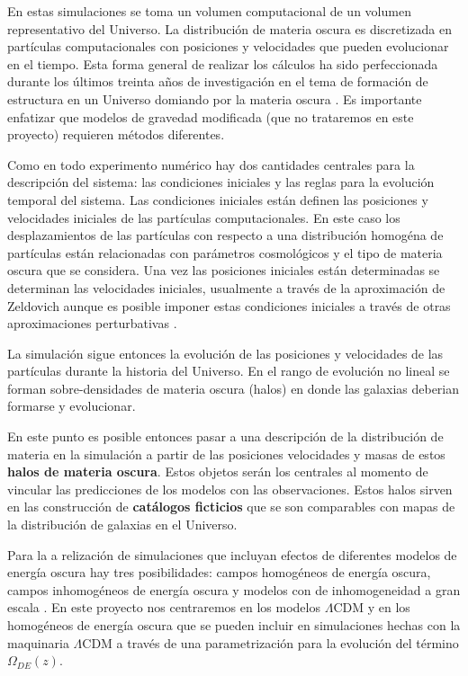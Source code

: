 En estas simulaciones se toma un volumen computacional de un volumen
representativo del Universo.
La distribuci\'on de materia oscura es discretizada en part\'iculas
computacionales con posiciones y velocidades que pueden evolucionar en
el tiempo.  
Esta forma general de realizar los c\'alculos ha sido
perfeccionada durante los \'ultimos treinta a\~nos de investigaci\'on
en el tema de formaci\'on de estructura en un Universo domiando por la
materia oscura
\cite{1985ApJ...292..371D,1999ApJ...522...82K,2005Natur.435..629S}. Es
importante enfatizar que modelos de gravedad modificada (que no
trataremos en este proyecto) requieren métodos diferentes.

Como en todo experimento num\'erico hay dos cantidades centrales para
la descripci\'on del sistema: las condiciones iniciales y las reglas
para la evoluci\'on temporal del sistema.  
Las condiciones iniciales est\'an definen las posiciones y velocidades
iniciales de las part\'iculas computacionales. 
En este caso los desplazamientos de las part\'iculas
con respecto a una distribuci\'on homog\'ena de part\'iculas están
relacionadas con parámetros cosmológicos y el tipo de materia oscura
que se considera.
Una vez las posiciones iniciales est\'an determinadas se
determinan las velocidades iniciales, usualmente a trav\'es de la
aproximaci\'on de Zeldovich aunque es posible imponer estas
condiciones iniciales a trav\'es de otras aproximaciones perturbativas
\cite{2014MNRAS.439.3630W}. 

La simulaci\'on sigue entonces la evoluci\'on de las posiciones y
velocidades de las part\'iculas durante la historia del
Universo. En el rango de evoluci\'on no lineal se forman
sobre-densidades de materia oscura (halos) en
donde  las galaxias deberian formarse y evolucionar. 

En este punto es posible entonces pasar a una
descripci\'on de la distribuci\'on de materia en la simulaci\'on a
partir de las posiciones  velocidades y masas de estos {\bf halos de materia
  oscura}. Estos objetos serán los centrales al momento de vincular
las predicciones de los modelos con las observaciones. Estos halos
sirven en las construcci\'on de {\bf cat\'alogos ficticios} que se
son comparables con mapas de la distribuci\'on de galaxias en el
Universo.

Para la a relizaci\'on de simulaciones  que incluyan
efectos de diferentes modelos de energ\'ia oscura hay tres
posibilidades: campos homog\'eneos de energ\'ia oscura, campos
inhomog\'eneos de energ\'ia oscura y modelos con de inhomogeneidad a
gran escala \cite{2012PDU.....1..162B}. En este proyecto nos
centraremos en los modelos $\Lambda$CDM y en los homog\'eneos de energ\'ia
oscura que se pueden incluir en simulaciones hechas con la maquinaria
$\Lambda$CDM a trav\'es de una parametrizaci\'on para la evoluci\'on
del t\'ermino $\Omega_{DE}(z)$.

